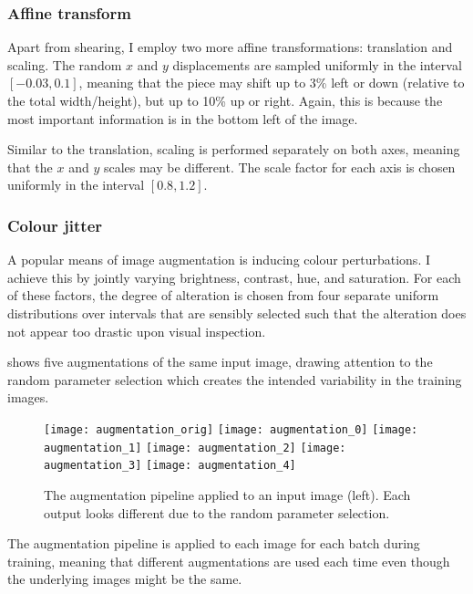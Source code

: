 \documentclass[../report.tex]{subfiles}
\begin{document}
\subsubsection{Affine transform}
Apart from shearing, I employ two more affine transformations: translation and scaling.
The random $x$ and $y$ displacements are sampled uniformly in the interval $[-0.03, 0.1]$, meaning that the piece may shift up to 3\% left or down (relative to the total width/height), but up to 10\% up or right.
Again, this is because the most important information is in the bottom left of the image.

Similar to the translation, scaling is performed separately on both axes, meaning that the $x$ and $y$ scales may be different.
The scale factor for each axis is chosen uniformly in the interval $[0.8, 1.2]$.

\subsubsection{Colour jitter}
A popular means of image augmentation is inducing colour perturbations.
I achieve this by jointly varying brightness, contrast, hue, and saturation.
For each of these factors, the degree of alteration is chosen from four separate uniform distributions over intervals that are sensibly selected such that the alteration does not appear too drastic upon visual inspection.

 shows five augmentations of the same input image, drawing attention to the random parameter selection which creates the intended variability in the training images.
\begin{figure}
    \centering
    \texttt{[image: augmentation\_orig]}
    \texttt{[image: augmentation\_0]}
    \texttt{[image: augmentation\_1]}
    \texttt{[image: augmentation\_2]}
    \texttt{[image: augmentation\_3]}
    \texttt{[image: augmentation\_4]}
    \caption[The augmentation pipeline applied to an input image.]{The augmentation pipeline applied to an input image (left). Each output looks different due to the random parameter selection.}
    \label{fig:augmentations}
\end{figure}
The augmentation pipeline is applied to each image for each batch during training, meaning that different augmentations are used each time even though the underlying images might be the same.
\end{document}
